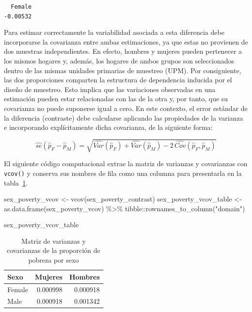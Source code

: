 \documentclass[
  spanish,
  11pt,
  letterpaper,
  oneside,
  open=any]{scrbook}
\newenvironment{Shaded}{\begin{snugshade}}{\end{snugshade}}
\newcommand{\FunctionTok}[1]{\textcolor[rgb]{0.28,0.35,0.67}{#1}}
\newcommand{\NormalTok}[1]{\textcolor[rgb]{0.00,0.23,0.31}{#1}}
\newcommand{\OtherTok}[1]{\textcolor[rgb]{0.00,0.23,0.31}{#1}}
\newcommand{\SpecialCharTok}[1]{\textcolor[rgb]{0.37,0.37,0.37}{#1}}
\newcommand{\StringTok}[1]{\textcolor[rgb]{0.13,0.47,0.30}{#1}}
\begin{document}
\begin{verbatim}
  Female 
-0.00532 
\end{verbatim}

Para estimar correctamente la variabilidad asociada a esta diferencia
debe incorporarse la covarianza entre ambas estimaciones, ya que estas
no provienen de dos muestras independientes. En efecto, hombres y
mujeres pueden pertenecer a los mismos hogares y, además, los hogares de
ambos grupos son seleccionados dentro de las mismas unidades primarias
de muestreo (UPM). Por consiguiente, las dos proporciones comparten la
estructura de dependencia inducida por el diseño de muestreo. Esto
implica que las variaciones observadas en una estimación pueden estar
relacionadas con las de la otra y, por tanto, que su covarianza no puede
suponerse igual a cero. En este contexto, el error estándar de la
diferencia (contraste) debe calcularse aplicando las propiedades de la
varianza e incorporando explícitamente dicha covarianza, de la siguiente
forma:

\[
\widehat{se}\left(\hat{p}_{F}-\hat{p}_{M}\right)
=
\sqrt{
\widehat{Var}\left(\hat{p}_{F}\right)
+
\widehat{Var}\left(\hat{p}_{M}\right)
-
2\,\widehat{Cov}\left(\hat{p}_{F},\hat{p}_{M}\right)
}
\]

El siguiente código computacional extrae la matriz de varianzas y
covarianzas con \texttt{vcov()} y conserva sus nombres de fila como una
columna para presentarla en la tabla~\ref{tbl-vcov-sex-pobreza}.

\begin{Shaded}
\begin{Highlighting}[]
\NormalTok{sex\_poverty\_vcov }\OtherTok{\textless{}{-}} \FunctionTok{vcov}\NormalTok{(sex\_poverty\_contrast)}
\NormalTok{sex\_poverty\_vcov\_table }\OtherTok{\textless{}{-}} \FunctionTok{as.data.frame}\NormalTok{(sex\_poverty\_vcov) }\SpecialCharTok{\%\textgreater{}\%}
\NormalTok{  tibble}\SpecialCharTok{::}\FunctionTok{rownames\_to\_column}\NormalTok{(}\StringTok{"domain"}\NormalTok{)}

\NormalTok{sex\_poverty\_vcov\_table}
\end{Highlighting}
\end{Shaded}

{

\begin{longtable}[]{@{}lrr@{}}

\caption{\label{tbl-vcov-sex-pobreza}Matriz de varianzas y covarianzas
de la proporción de pobreza por sexo}

\tabularnewline

\toprule\noalign{}
Sexo & Mujeres & Hombres \\
\midrule\noalign{}
\endhead
\bottomrule\noalign{}
\endlastfoot
Female & 0.000998 & 0.000918 \\
Male & 0.000918 & 0.001342 \\

\end{longtable}

}
\end{document}
